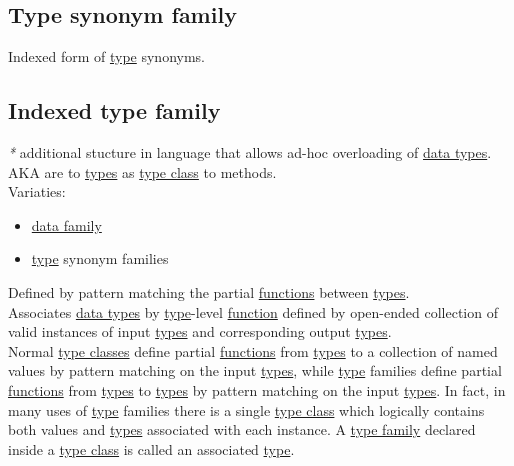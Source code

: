 \documentclass[11pt]{article}
\begin{document}
\subsection{\label{orgbfe6db5}Type synonym family}
\label{sec:orged0880e}
Indexed form of \hyperref[org4fbaeb8]{type} synonyms.\\

\subsection{\label{org9bf2487}Indexed type family}
\label{sec:org8753982}
\emph{*} additional stucture in language that allows ad-hoc overloading of \hyperref[org88981ee]{data types}. AKA are to \hyperref[org3927fd9]{types} as \hyperref[orga4a5066]{type class} to methods.\\

Variaties:\\
\begin{itemize}
\item \hyperref[org9a64ab0]{data family}\\
\item \hyperref[org4fbaeb8]{type} synonym families\\
\end{itemize}

Defined by pattern matching the partial \hyperref[org66c5288]{functions} between \hyperref[org3927fd9]{types}.\\
Associates \hyperref[org88981ee]{data types} by \hyperref[org4fbaeb8]{type}-level \hyperref[orgeb5cddb]{function} defined by open-ended collection of valid instances of input \hyperref[org3927fd9]{types} and corresponding output \hyperref[org3927fd9]{types}.\\

Normal \hyperref[org2efac60]{type classes} define partial \hyperref[org66c5288]{functions} from \hyperref[org3927fd9]{types} to a collection of named values by pattern matching on the input \hyperref[org3927fd9]{types}, while \hyperref[org4fbaeb8]{type} families define partial \hyperref[org66c5288]{functions} from \hyperref[org3927fd9]{types} to \hyperref[org3927fd9]{types} by pattern matching on the input \hyperref[org3927fd9]{types}. In fact, in many uses of \hyperref[org4fbaeb8]{type} families there is a single \hyperref[orga4a5066]{type class} which logically contains both values and \hyperref[org3927fd9]{types} associated with each instance. A \hyperref[org7104d91]{type family} declared inside a \hyperref[orga4a5066]{type class} is called an associated \hyperref[org4fbaeb8]{type}.\\
\end{document}
